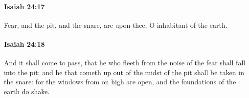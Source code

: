 		\paragraph{Isaiah 24:17} %
			\label{ISAIAH-24-17}

			Fear, and the pit, and the snare, are upon thee, O inhabitant of the earth.


		\paragraph{Isaiah 24:18} %
			\label{ISAIAH-24-18}

			And it shall come to pass, that he who fleeth from the noise of the fear shall fall into the pit; and he that cometh up out of the midst of the pit shall be taken in the snare: for the windows from on high are open, and the foundations of the earth do shake.


